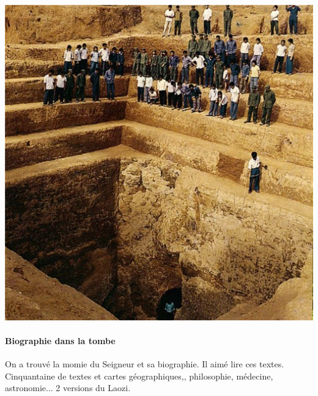  \begin{marginfigure}
    \centering
    \includegraphics[width=\textwidth]{ConfucianismeTaoismeBouddhismeChinois/Images/tombelaozi.jpg}

    \label{fig:enter-label}
\end{marginfigure}

\paragraph{Biographie dans la tombe }On a trouvé la momie du Seigneur et sa biographie. Il aimé lire ces textes. Cinquantaine de textes et cartes géographiques,, philosophie, médecine, astronomie... 2 versions du Laozi.

 


